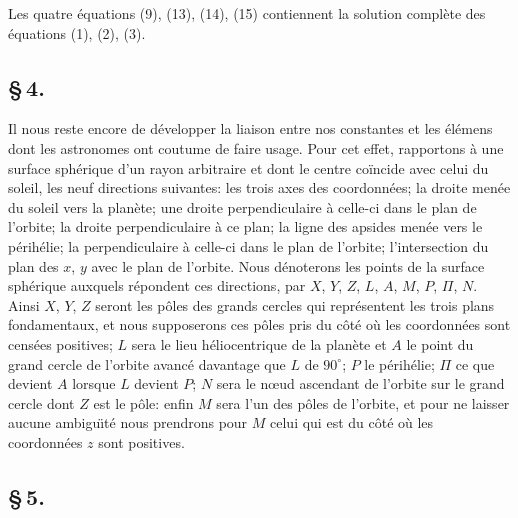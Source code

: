 \documentclass[12pt,a4paper]{article}
\begin{document}
Les quatre \'{e}quations (9), (13), (14), (15) contiennent la solution compl\`{e}te des \'{e}quations (1), (2), (3).

\subsection*{\S\,4.}

Il nous reste encore de d\'{e}velopper la liaison entre nos constantes et les \'{e}l\'{e}mens dont les astronomes ont coutume de faire usage. Pour cet effet, rapportons \`{a} une surface sph\'{e}rique d'un rayon arbitraire et dont le centre co\"{i}ncide avec celui du soleil, les neuf directions suivantes: les trois axes des coordonn\'{e}es; la droite men\'{e}e du soleil vers la plan\`{e}te; une droite perpendiculaire \`{a} celle-ci dans le plan de l'orbite; la droite perpendiculaire \`{a} ce plan; la ligne des apsides men\'{e}e vers le p\'{e}rih\'{e}lie; la perpendiculaire \`{a} celle-ci dans le plan de l'orbite; l'intersection du plan des $x$, $y$ avec le plan de l'orbite. Nous d\'{e}noterons les points de la surface sph\'{e}rique auxquels r\'{e}pondent ces directions, par $X$, $Y$, $Z$, $L$, $A$, $M$, $P$, $\Pi$, $N$. Ainsi $X$, $Y$, $Z$ seront les p\^{o}les des grands cercles qui repr\'{e}sentent les trois plans fondamentaux, et nous supposerons ces p\^{o}les pris du c\^{o}t\'{e} o\`{u} les coordonn\'{e}es sont cens\'{e}es positives; $L$ sera le lieu h\'{e}liocentrique de la plan\`{e}te et $A$ le point du grand cercle de l'orbite avanc\'{e} davantage que $L$ de $90^\circ$; $P$ le p\'{e}rih\'{e}lie; $\Pi$ ce que devient $A$ lorsque $L$ devient $P$; $N$ sera le n\oe ud ascendant de l'orbite sur le grand cercle dont $Z$ est le p\^{o}le: enfin $M$ sera l'un des p\^{o}les de l'orbite, et pour ne laisser aucune ambigu\"{\i}t\'{e} nous prendrons pour $M$ celui qui est du c\^{o}t\'{e} o\`{u} les coordonn\'{e}es $z$ sont positives.
\newpage
\subsection*{\S\,5.}
\end{document}
